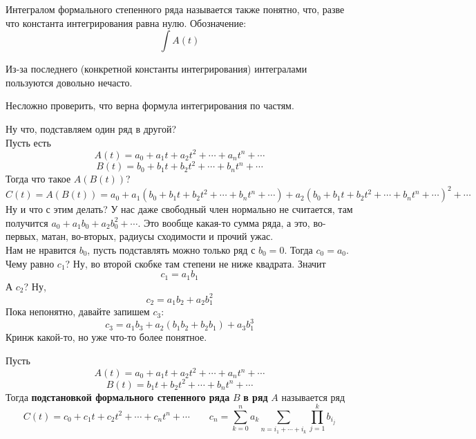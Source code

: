 \documentclass{article}
\begin{document}
    \begin{definition}
        Интегралом формального степенного ряда называется также понятно, что, разве что константа интегрирования равна нулю. Обозначение:
        $$
        \int A(t)
        $$
    \end{definition}
    \begin{remark}
        Из-за последнего (конкретной константы интегрирования) интегралами пользуются довольно нечасто.
    \end{remark}
    \begin{property}
        Несложно проверить, что верна формула интегрирования по частям.
    \end{property}
    \begin{remark}
        Ну что, подставляем один ряд в другой?\\
        Пусть есть
        $$A(t)=a_0+a_1t+a_2t^2+\cdots+a_nt^n+\cdots$$
        $$B(t)=b_0+b_1t+b_2t^2+\cdots+b_nt^n+\cdots$$
        Тогда что такое $A(B(t))$?
        $$
        C(t)=A(B(t))=a_0+a_1(b_0+b_1t+b_2t^2+\cdots+b_nt^n+\cdots)+a_2(b_0+b_1t+b_2t^2+\cdots+b_nt^n+\cdots)^2+\cdots
        $$
        Ну и что с этим делать? У нас даже свободный член нормально не считается, там получится $a_0+a_1b_0+a_2b_0^2+\cdots$. Это вообще какая-то сумма ряда, а это, во-первых, матан, во-вторых, радиусы сходимости и прочий ужас.\\
        Нам не нравится $b_0$, пусть подставлять можно только ряд с $b_0=0$. Тогда $c_0=a_0$. Чему равно $c_1$? Ну, во второй скобке там степени не ниже квадрата. Значит
        $$
        c_1=a_1b_1
        $$
        А $c_2$? Ну,
        $$
        c_2=a_1b_2+a_2b_1^2
        $$
        Пока непонятно, давайте запишем $c_3$:
        $$
        c_3=a_1b_3+a_2(b_1b_2+b_2b_1)+a_3b_1^3
        $$
        Кринж какой-то, но уже что-то более понятное.
    \end{remark}
    \begin{definition}
        Пусть
        $$A(t)=a_0+a_1t+a_2t^2+\cdots+a_nt^n+\cdots$$
        $$B(t)=b_1t+b_2t^2+\cdots+b_nt^n+\cdots$$
        Тогда \textbf{подстановкой формального степенного ряда} $B$ \textbf{в ряд} $A$ называется ряд
        $$
        C(t)=c_0+c_1t+c_2t^2+\cdots+c_nt^n+\cdots\qquad c_n=\sum\limits_{k=0}^na_k\sum\limits_{n=i_1+\cdots+i_k}\prod\limits_{j=1}^kb_{i_j}
        $$
    \end{definition}
\end{document}
